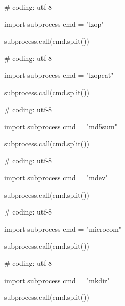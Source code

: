 \begin{mylisting}[label={lst:acpid},language=sh,caption=lzop]

# coding: utf-8

import subprocess
cmd = "lzop"

subprocess.call(cmd.split())

\end{mylisting}

\begin{mylisting}[label={lst:acpid},language=sh,caption=lzopcat]

# coding: utf-8

import subprocess
cmd = "lzopcat"

subprocess.call(cmd.split())

\end{mylisting}

\begin{mylisting}[label={lst:acpid},language=sh,caption=md5sum]

# coding: utf-8

import subprocess
cmd = "md5sum"

subprocess.call(cmd.split())

\end{mylisting}

\begin{mylisting}[label={lst:acpid},language=sh,caption=mdev]

# coding: utf-8

import subprocess
cmd = "mdev"

subprocess.call(cmd.split())

\end{mylisting}

\begin{mylisting}[label={lst:acpid},language=sh,caption=microcom]

# coding: utf-8

import subprocess
cmd = "microcom"

subprocess.call(cmd.split())

\end{mylisting}

\begin{mylisting}[label={lst:acpid},language=sh,caption=mkdir]

# coding: utf-8

import subprocess
cmd = "mkdir"

subprocess.call(cmd.split())

\end{mylisting}

